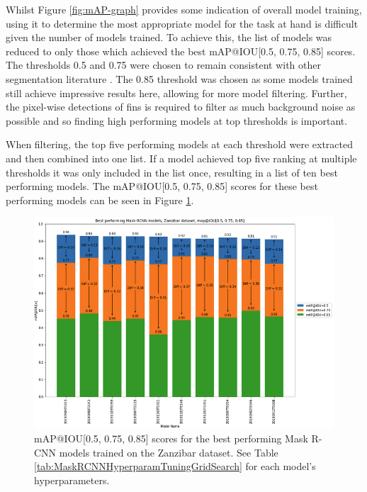 Whilst Figure \ref{fig:mAP-graph} provides some indication of overall model training, using it to determine the most appropriate model for the task at hand is difficult given the number of models trained. To achieve this, the list of models was reduced to only those which achieved the best mAP@IOU[0.5, 0.75, 0.85] scores. The thresholds 0.5 and 0.75 were chosen to remain consistent with other segmentation literature \cite{bolya_190402689_2019, wang_solov2_2020, tian_fcos_2019}. The 0.85 threshold was chosen as some models trained still achieve impressive results here, allowing for more model filtering. Further, the pixel-wise detections of fins is required to filter as much background noise as possible and so finding high performing models at top thresholds is important.

When filtering, the top five performing models at each threshold were extracted and then combined into one list. If a model  achieved top five ranking at multiple thresholds it was only included in the list once, resulting in a list of ten best performing models. The mAP@IOU[0.5, 0.75, 0.85] scores for these best performing models can be seen in Figure \ref{fig:mAP-best-models-bar-chart}.

\begin{figure}[h]
	\begin{center}
		\includegraphics[scale=0.55]{Chapter3/figs/mask-RCNN-model-bar-chart.png}
	\end{center}
	\caption[mAP@IOU{[0.5, 0.75, 0.85]} scores for the best performing Mask R-CNN models trained on the Zanzibar dataset.]{mAP@IOU[0.5, 0.75, 0.85] scores for the best performing Mask R-CNN models trained on the Zanzibar dataset. See Table \ref{tab:MaskRCNNHyperparamTuningGridSearch} for each model's hyperparameters.}
	\label{fig:mAP-best-models-bar-chart}
\end{figure}

